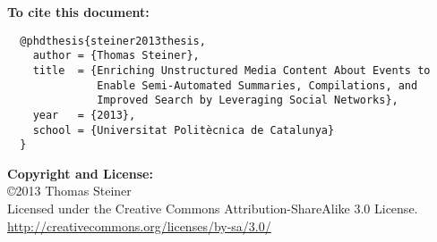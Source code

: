 \begin{acknowledgements}


\vspace{40mm}

\textbf{To cite this document:}

\small
\begin{verbatim}
  @phdthesis{steiner2013thesis,
    author = {Thomas Steiner},
    title  = {Enriching Unstructured Media Content About Events to
              Enable Semi-Automated Summaries, Compilations, and 
              Improved Search by Leveraging Social Networks},
    year   = {2013},
    school = {Universitat Politècnica de Catalunya}
  }
\end{verbatim}

\normalsize

\textbf{Copyright and License:}\\
\copyright 2013 Thomas Steiner\\
Licensed under the Creative Commons Attribution-ShareAlike 3.0 License.\\
\url{http://creativecommons.org/licenses/by-sa/3.0/}

\end{acknowledgements}
